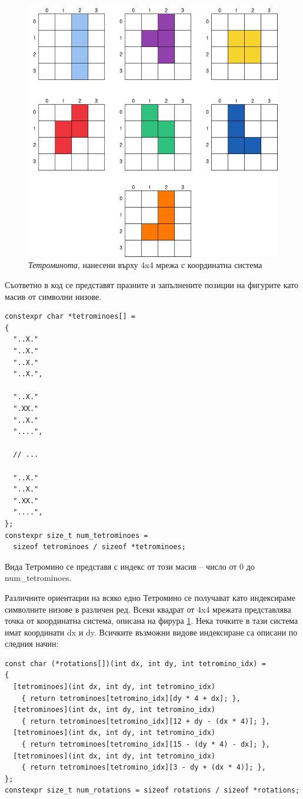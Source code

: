 \documentclass[titlepage, oneside, 14pt]{extbook}
\renewcommand{\texttt}[1]{{\small\ttfamily #1}}
\begin{document}
\begin{figure}[!htbp]
    \centering
    \includegraphics[width=0.5\linewidth]{img/tetrominoes_grid.drawio.png}
    \caption{\textit{Тетроминота}, нанесени върху 4x4 мрежа с координатна система}
    \label{tetrogrid}
\end{figure}

Съответно в код се представят празните и запълнените позиции на фигурите като масив от символни низове.

\begin{verbatim}
constexpr char *tetrominoes[] =
{
  "..X."
  "..X."
  "..X."
  "..X.",

  "..X."
  ".XX."
  "..X."
  "....",

  // ...

  "..X."
  "..X."
  ".XX."
  "....",
};
constexpr size_t num_tetrominoes =
  sizeof tetrominoes / sizeof *tetrominoes;
\end{verbatim}

\begin{sloppypar}Вида Тетромино се представя с индекс от този масив -- число от 0 до \texttt{num_tetrominoes}.\end{sloppypar}

Различните ориентации на всяко едно Тетромино се получават като индексираме символните низове в различен ред.
Всеки квадрат от 4x4 мрежата представлява точка от координатна система, описана на фирура \ref{tetrogrid}.
Нека точките в тази система имат координати \texttt{dx} и \texttt{dy}. Всичките възможни видове индексиране са описани по следния начин:

\begin{verbatim}
const char (*rotations[])(int dx, int dy, int tetromino_idx) =
{
  [tetrominoes](int dx, int dy, int tetromino_idx)
    { return tetrominoes[tetromino_idx][dy * 4 + dx]; },
  [tetrominoes](int dx, int dy, int tetromino_idx)
    { return tetrominoes[tetromino_idx][12 + dy - (dx * 4)]; },
  [tetrominoes](int dx, int dy, int tetromino_idx)
    { return tetrominoes[tetromino_idx][15 - (dy * 4) - dx]; },
  [tetrominoes](int dx, int dy, int tetromino_idx)
    { return tetrominoes[tetromino_idx][3 - dy + (dx * 4)]; },
};
constexpr size_t num_rotations = sizeof rotations / sizeof *rotations;
\end{verbatim}
\end{document}
